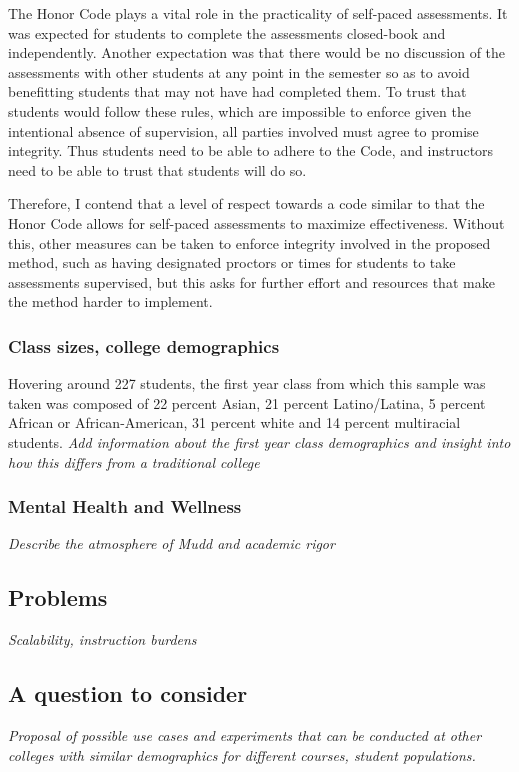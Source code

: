 The Honor Code plays a vital role in the practicality of self-paced assessments. It was expected for students to complete the assessments closed-book and independently. Another expectation was that there would be no discussion of the assessments with other students at any point in the semester so as to avoid benefitting students that may not have had completed them. To trust that students would follow these rules, which are impossible to enforce given the intentional absence of supervision, all parties involved must agree to promise integrity. Thus students need to be able to adhere to the Code, and instructors need to be able to trust that students will do so.

Therefore, I contend that a level of respect towards a code similar to that the Honor Code allows for self-paced assessments to maximize effectiveness. Without this, other measures can be taken to enforce integrity involved in the proposed method, such as having designated proctors or times for students to take assessments supervised, but this asks for further effort and resources that make the method harder to implement.

\subsubsection{Class sizes, college demographics}
Hovering around 227 students, the first year class from which this sample was taken was composed of 22 percent Asian, 21 percent Latino/Latina, 5 percent African or African-American, 31 percent white and 14 percent multiracial students. 
\textit{Add information about the first year class demographics and insight into how this differs from a traditional college}

\subsubsection{Mental Health and Wellness}
\textit{Describe the atmosphere of Mudd and academic rigor}

\subsection{Problems}
\textit{Scalability, instruction burdens}

\subsection{A question to consider}
\textit{Proposal of possible use cases and experiments that can be conducted at other colleges with similar demographics for different courses, student populations.}
